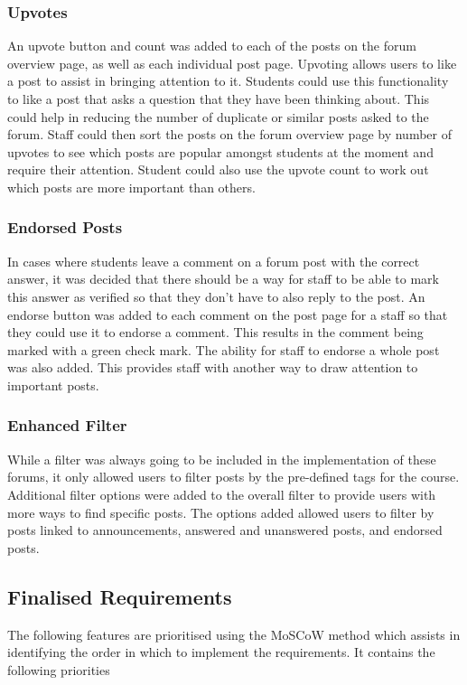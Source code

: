 \subsubsection{Upvotes}
An upvote button and count was added to each of the posts on the forum overview page, as well as each individual post page.
Upvoting allows users to like a post to assist in bringing attention to it.
Students could use this functionality to like a post that asks a question that they have been thinking about.
This could help in reducing the number of duplicate or similar posts asked to the forum.
Staff could then sort the posts on the forum overview page by number of upvotes to see which posts are popular amongst students at the moment and require their attention.
Student could also use the upvote count to work out which posts are more important than others.

\subsubsection{Endorsed Posts}
In cases where students leave a comment on a forum post with the correct answer, it was decided that there should be a way for staff to be able to mark this answer as verified so that they don't have to also reply to the post.
An endorse button was added to each comment on the post page for a staff so that they could use it to endorse a comment.
This results in the comment being marked with a green check mark.
The ability for staff to endorse a whole post was also added.
This provides staff with another way to draw attention to important posts.

\subsubsection{Enhanced Filter}
While a filter was always going to be included in the implementation of these forums, it only allowed users to filter posts by the pre-defined tags for the course.
Additional filter options were added to the overall filter to provide users with more ways to find specific posts.
The options added allowed users to filter by posts linked to announcements, answered and unanswered posts, and endorsed posts.

\subsection{Finalised Requirements}
The following features are prioritised using the MoSCoW method which assists in identifying the order in which to implement the requirements. \cite{moscow}
It contains the following priorities

